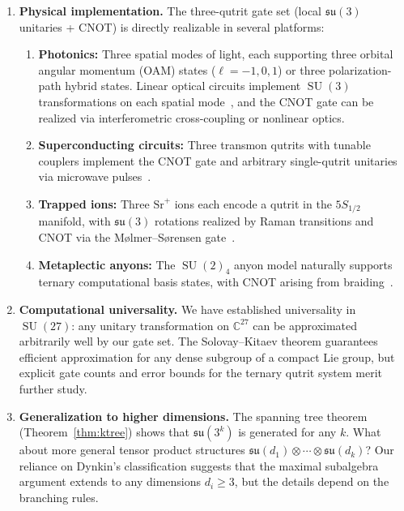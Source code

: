 \documentclass[12pt,a4paper]{article}
\newcommand{\SU}{\operatorname{SU}}
\begin{document}
\begin{enumerate}
\item \textbf{Physical implementation.} The three-qutrit gate set
(local $\mathfrak{su}(3)$ unitaries + CNOT) is directly realizable in
several platforms:
  \begin{enumerate}[label=\alph*.]
  \item \textbf{Photonics:} Three spatial modes of light, each
  supporting three orbital angular momentum (OAM) states
  ($\ell = -1,0,1$) or three polarization-path hybrid states. Linear
  optical circuits implement $\SU(3)$ transformations on each spatial
  mode~\cite{reck1994experimental}, and the CNOT gate can be realized
  via interferometric cross-coupling or nonlinear optics.
  \item \textbf{Superconducting circuits:} Three transmon qutrits with
  tunable couplers implement the CNOT gate and arbitrary single-qutrit
  unitaries via microwave pulses~\cite{blais2021circuit}.
  \item \textbf{Trapped ions:} Three $\text{Sr}^+$ ions each encode a
  qutrit in the $5S_{1/2}$ manifold, with $\mathfrak{su}(3)$ rotations
  realized by Raman transitions and CNOT via the M{\o}lmer--S{\o}rensen
  gate~\cite{bermudez2012tripartite}.
  \item \textbf{Metaplectic anyons:} The $\SU(2)_4$ anyon model
  naturally supports ternary computational basis states, with CNOT
  arising from braiding~\cite{bocharov2016improved,cuietal2015}.
  \end{enumerate}

\item \textbf{Computational universality.} We have established
universality in $\SU(27)$: any unitary transformation on $\mathbb{C}^{27}$
can be approximated arbitrarily well by our gate set. The Solovay--Kitaev
theorem guarantees efficient approximation for any dense subgroup of a
compact Lie group, but explicit gate counts and error bounds for the
ternary qutrit system merit further study.

\item \textbf{Generalization to higher dimensions.} The spanning tree
theorem (Theorem~\ref{thm:ktree}) shows that $\mathfrak{su}(3^k)$ is
generated for any $k$. What about more general tensor product structures
$\mathfrak{su}(d_1) \otimes \cdots \otimes \mathfrak{su}(d_k)$? Our
reliance on Dynkin's classification suggests that the maximal subalgebra
argument extends to any dimensions $d_i \geq 3$, but the details depend
on the branching rules.
\end{enumerate}
\end{document}
